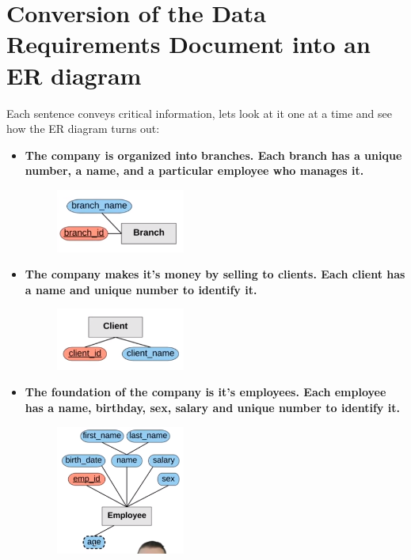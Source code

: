 \section{Conversion of the Data Requirements Document into an ER diagram}
Each sentence conveys critical information, lets look at it one at a time and see how the ER diagram turns out:
\begin{itemize}
    \item \textbf{The company is organized into branches. Each branch has a unique number, a name, and a particular employee who manages it.}
        \begin{figure}[H]
            \centering
            \includegraphics[width=0.4\textwidth]{./Figs/2020-12-24-00-13-51.png}
        \end{figure}
    
    \item \textbf{The company makes it's money by selling to clients. Each client has a name and unique number to identify it.}
        \begin{figure}[H]
            \centering
            \includegraphics[width=0.4\textwidth]{./Figs/2020-12-24-00-14-18.png}
        \end{figure}
    
    \item \textbf{The foundation of the company is it's employees. Each employee has a name, birthday, sex, salary and unique number to identify it.}
        \begin{figure}[H]
            \centering
            \includegraphics[width=0.4\textwidth]{./Figs/2020-12-24-00-14-53.png}
        \end{figure}
    

\end{itemize}
